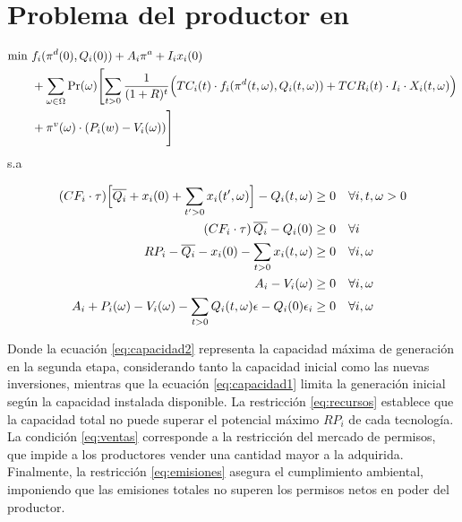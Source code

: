 




\section{Problema del productor en \protect{}}

\begin{equation}
\begin{aligned}
\min \ & f_{i}(\pi^{d}(0), Q_{i}(0)) + A_{i}\pi^{a} + I_{i}x_{i}(0) \\
&+ \sum_{\omega \in \Omega} \Pr(\omega) \Biggl[\sum_{t>0} \frac{1}{(1+R)^{t}} \Bigl( TC_{i}(t) \cdot f_{i}(\pi^{d}(t,\omega), Q_{i}(t,\omega)) 
+ TCR_{i}(t) \cdot I_{i} \cdot X_{i}(t,\omega)\Bigr) \\
&+ \pi^{v}(\omega)\cdot(P_{i}(w) - V_{i}(\omega))\Biggr]
\end{aligned}
\end{equation}
s.a

\begin{align}
(CF_{i} \cdot \tau)\Bigl[\overline{Q_{i}} + x_{i}(0) + \sum_{t'>0} x_{i}(t',\omega)\Bigr] - Q_{i}(t,\omega) &\ge 0 
&& \forall i,t,\omega > 0\label{eq:capacidad2}\\
(CF_{i} \cdot \tau)\,\overline{Q_{i}} - Q_{i}(0) &\ge 0 
&& \forall i \label{eq:capacidad1}\\
RP_{i} - \overline{Q_{i}} - x_{i}(0) - \sum_{t>0} x_{i}(t,\omega) &\ge 0 
&& \forall i,\omega \label{eq:recursos}\\
A_{i} - V_{i}(\omega) &\ge 0 
&& \forall i,\omega \label{eq:ventas}\\
A_{i} + P_{i}(\omega) - V_{i}(\omega) - \sum_{t>0} Q_{i}(t,\omega)\epsilon - Q_{i}(0)\epsilon_{i} &\ge 0 
&& \forall i,\omega \label{eq:emisiones}
\end{align}

Donde la ecuación \eqref{eq:capacidad2} representa la capacidad máxima de generación en la segunda etapa, considerando tanto la capacidad inicial como las nuevas inversiones, mientras que la ecuación \eqref{eq:capacidad1} limita la generación inicial según la capacidad instalada disponible. La restricción \eqref{eq:recursos} establece que la capacidad total no puede superar el potencial máximo $RP_i$ de cada tecnología. La condición \eqref{eq:ventas} corresponde a la restricción del mercado de permisos, que impide a los productores vender una cantidad mayor a la adquirida. Finalmente, la restricción \eqref{eq:emisiones} asegura el cumplimiento ambiental, imponiendo que las emisiones totales no superen los permisos netos en poder del productor.

